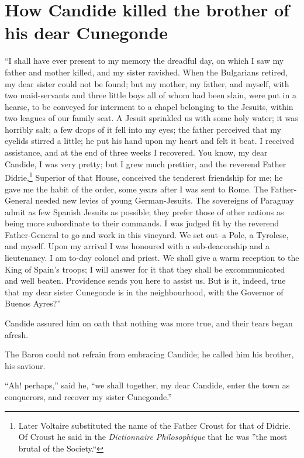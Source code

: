 \chapter{How Candide killed the brother of his dear Cunegonde}
\lettrine[lraise=0.1,nindent=0em,slope=-.5em]{``I}{} shall have ever present to my memory the dreadful day, on which I saw my father and mother killed, and my sister ravished. When the Bulgarians retired, my dear sister could not be found; but my mother, my father, and myself, with two maid-servants and three little boys all of whom had been slain, were put in a hearse, to be conveyed for interment to a chapel belonging to the Jesuits, within two leagues of our family seat. A Jesuit sprinkled us with some holy water; it was horribly salt; a few drops of it fell into my eyes; the father perceived that my eyelids stirred a little; he put his hand upon my heart and felt it beat. I received assistance, and at the end of three weeks I recovered. You know, my dear Candide, I was very pretty; but I grew much prettier, and the reverend Father Didrie,\footnote{Later Voltaire substituted the name of the Father Croust for that of Didrie. Of Croust he said in the \textit{Dictionnaire Philosophique} that he was ''the most brutal of the Society.``} Superior of that House, conceived the tenderest friendship for me; he gave me the habit of the order, some years after I was sent to Rome. The Father-General needed new levies of young German-Jesuits. The sovereigns of Paraguay admit as few Spanish Jesuits as possible; they prefer those of other nations as being more subordinate to their commands. I was judged fit by the reverend Father-General to go and work in this vineyard. We set out--a Pole, a Tyrolese, and myself. Upon my arrival I was honoured with a sub-deaconship and a lieutenancy. I am to-day colonel and priest. We shall give a warm reception to the King of Spain's troops; I will answer for it that they shall be excommunicated and well beaten. Providence sends you here to assist us. But is it, indeed, true that my dear sister Cunegonde is in the neighbourhood, with the Governor of Buenos Ayres?''

Candide assured him on oath that nothing was more true, and their tears began afresh.

The Baron could not refrain from embracing Candide; he called him his brother, his saviour.

``Ah! perhaps,'' said he, ``we shall together, my dear Candide, enter the town as conquerors, and recover my sister Cunegonde.''

